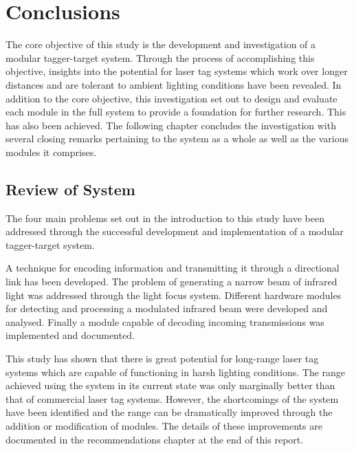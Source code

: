 \chapter{Conclusions}
\label{ch_conclusions}



The core objective of this study is the development and investigation of a modular tagger-target system. Through the process of accomplishing this objective, insights into the potential for laser tag systems which work over longer distances and are tolerant to ambient lighting conditions have been revealed.
In addition to the core objective, this investigation set out to design and evaluate each module in the full system to provide a foundation for further research. This has also been achieved. The following chapter concludes the investigation with several closing remarks pertaining to the system as a whole as well as the various modules it comprises.

\section{Review of System}


The four main problems set out in the introduction to this study have been addressed through the successful development and implementation of a modular tagger-target system.

A technique for encoding information and transmitting it through a directional link has been developed. The problem of generating a narrow beam of infrared light was addressed through the light focus system. Different hardware modules for detecting and processing a modulated infrared beam were developed and analysed. Finally a module capable of decoding incoming transmissions was implemented and documented.

This study has shown that there is great potential for long-range laser tag systems which are capable of functioning in harsh lighting conditions. The range achieved using the system in its current state was only marginally better than that of commercial laser tag systems. However, the shortcomings of the system have been identified and the range can be dramatically improved through the addition or modification of modules. The details of these improvements are documented in the recommendations chapter at the end of this report.

